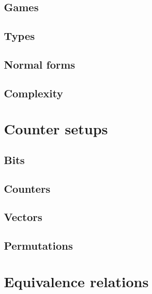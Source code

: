 \documentclass{scrbook}
\begin{document}
\section{Games}\label{sec:logic-games}


\section{Types}\label{sec:types}


\section{Normal forms}\label{sec:scott-nf}


\section{Complexity}\label{sec:complexity}




\chapter{Counter setups}\label{ch:setups}


\section{Bits}


\section{Counters}


\section{Vectors}


\section{Permutations}


\chapter{Equivalence relations}\label{ch:equivalences}

\end{document}
